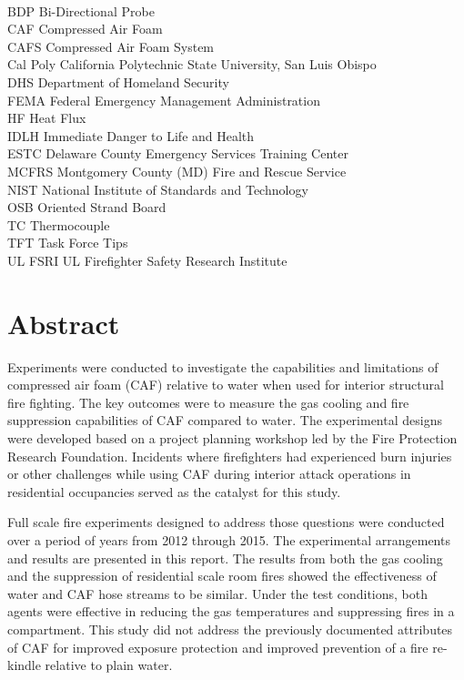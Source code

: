 \documentclass[12pt,oneside]{book}
\begin{document}
\begin{tabbing}
\hspace{1.5in} \= \\
BDP \> Bi-Directional Probe \\
CAF \> Compressed Air Foam \\
CAFS \> Compressed Air Foam System \\
Cal Poly \> California Polytechnic State University, San Luis Obispo \\
DHS \> Department of Homeland Security \\
FEMA \> Federal Emergency Management Administration \\
HF \> Heat Flux \\
IDLH \> Immediate Danger to Life and Health \\
ESTC \> Delaware County Emergency Services Training Center \\
MCFRS \> Montgomery County (MD) Fire and Rescue Service \\
NIST \> National Institute of Standards and Technology \\
OSB \> Oriented Strand Board \\
TC \> Thermocouple \\
TFT \> Task Force Tips \\
UL FSRI \> UL Firefighter Safety Research Institute \\

\end{tabbing}

\mainmatter

\chapter*{\centering Abstract}

Experiments were conducted to investigate the capabilities and limitations of compressed air foam (CAF) relative to water when used for interior structural fire fighting. The key outcomes were to measure the gas cooling and fire suppression capabilities of CAF compared to water. The experimental designs were developed based on a project planning workshop led by the Fire Protection Research Foundation. Incidents where firefighters had experienced burn injuries or other challenges while using CAF during interior attack operations in residential occupancies served as the catalyst for this study.

Full scale fire experiments designed to address those questions were conducted over a period of years from 2012 through 2015. The experimental arrangements and results are presented in this report. The results from both the gas cooling and the suppression of residential scale room fires showed the effectiveness of water and CAF hose streams to be similar. Under the test conditions, both agents were effective in reducing the gas temperatures and suppressing fires in a compartment. This study did not address the previously documented attributes of CAF for improved exposure protection and improved prevention of a fire re-kindle relative to plain water. 
\end{document}
